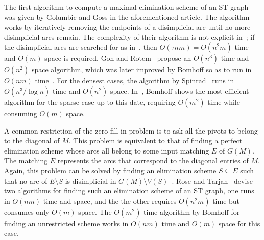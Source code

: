 \documentclass[a4paper,11pt]{article}
\begin{document}
The first algorithm to compute a maximal elimination scheme of an ST graph was given by Golumbic and Goss in the aforementioned article.  The algorithm works by iteratively removing the endpoints of a disimplicial arc until no more disimplicial arcs remain.  The complexity of their algorithm is not explicit in~\cite{GolumbicGossJGT1978}; if the disimplicial arcs are searched for as in~\cite{BomhoffMantheyDAM2013}, then $O(\tau nm) = O(n^2m)$ time and $O(m)$ space is required.  Goh and Rotem~\cite{GohRotemIPL1982} propose an $O(n^3)$ time and $O(n^2)$ space algorithm, which was later improved by Bomhoff so as to run in $O(nm)$ time~\cite{Bomhoff2011}.  For the densest cases, the algorithm by Spinrad~\cite{SpinradDAM2004} runs in $O(n^3/\log n)$ time and $O(n^2)$ space.  In~\cite{Bomhoff2011}, Bomhoff shows the most efficient algorithm for the sparse case up to this date, requiring $O(m^2)$ time while consuming $O(m)$ space.

A common restriction of the zero fill-in problem is to ask all the pivots to belong to the diagonal of $M$.  This problem is equivalent to that of finding a perfect elimination scheme whose arcs all belong to some input matching $E$ of $G(M)$.  The matching $E$ represents the arcs that correspond to the diagonal entries of $M$.  Again, this problem can be solved by finding an elimination scheme $S \subseteq E$ such that no arc of $E \setminus S$ is disimplicial in $G(M) \setminus V(S)$~\cite{GolumbicGossJGT1978}.  Rose and Tarjan~\cite{RoseTarjanSJAM1978} devise two algorithms for finding such an elimination scheme of an ST graph, one runs in $O(nm)$ time and space, and the the other requires $O(n^2m)$ time but consumes only $O(m)$ space.  The $O(m^2)$ time algorithm by Bomhoff for finding an unrestricted scheme works in $O(nm)$ time and $O(m)$ space for this case.
\end{document}
